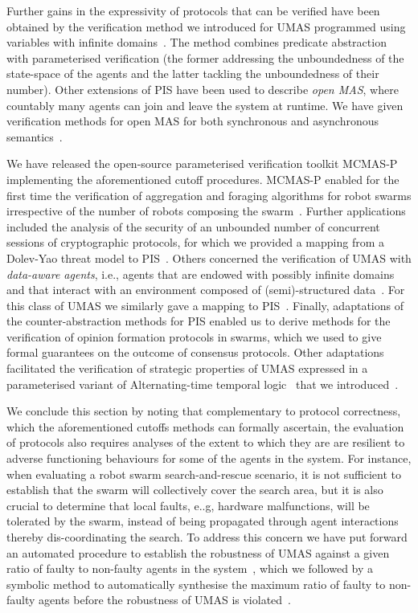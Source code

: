 \documentclass{article}
\begin{document}
Further gains in the expressivity of protocols that can be verified have been
obtained by the verification method we introduced for UMAS programmed using
variables with infinite domains~\cite{KouvarosLomuscio17a}. The method  combines
predicate abstraction~\cite{LomuscioMichaliszyn15} with parameterised
verification (the former addressing the unboundedness of the state-space of the
agents and the latter tackling the unboundedness of their number).  Other
extensions of PIS have been used to describe {\em open MAS}, where countably
many agents can join and leave the system at runtime. We have given verification
methods for open MAS for both synchronous and asynchronous
semantics~\cite{Kouvaros+19}.

We have released the open-source parameterised verification toolkit
\textsc{MCMAS-P} implementing the aforementioned cutoff procedures.
\textsc{MCMAS-P} enabled for the first time the verification of aggregation and
foraging algorithms for robot swarms irrespective of the number of robots
composing the swarm~\cite{KouvarosLomuscio15b,KouvarosLomuscio16a}.  Further
applications included the analysis of the security of an unbounded number of
concurrent sessions of cryptographic protocols, for which we provided a mapping
from a Dolev-Yao threat model to PIS~\cite{BoureanuKouvarosLomuscio16}.  Others
concerned  the verification of UMAS with {\em data-aware agents}, i.e., agents
that are endowed with possibly infinite domains and that interact with an
environment composed of (semi)-structured data~\cite{MontaliCalvaneseGiacomo14}.
For this class of UMAS we similarly  gave a mapping to
PIS~\cite{BelardinelliKouvarosLomuscio17}.  Finally,  adaptations of the
counter-abstraction methods for PIS  enabled us to derive methods for the
verification of opinion formation protocols in swarms, which we used to give
formal guarantees on the outcome of consensus protocols. Other adaptations
facilitated the verification of strategic properties of UMAS expressed in a
parameterised variant  of Alternating-time temporal logic~\cite{Alur+98a} that
we introduced~\cite{KouvarosLomuscio16c}.

We conclude this section by noting that complementary to protocol correctness,
which the aforementioned cutoffs methods can formally ascertain, the evaluation
of protocols also requires   analyses of the extent to which they are are
resilient to adverse functioning behaviours for some of the agents in the
system.  For instance, when evaluating a robot swarm search-and-rescue scenario,
it is not sufficient to establish that the swarm will collectively cover the
search area, but it is also crucial to determine that local faults, e..g,
hardware malfunctions, will be tolerated by the swarm, instead of being
propagated through agent interactions thereby dis-coordinating the search. To
address this concern we have put forward an automated procedure to establish the
robustness of UMAS against a given ratio of faulty to non-faulty agents in the
system~\cite{KouvarosLomuscio17b}, which we followed by a symbolic method to
automatically synthesise the maximum ratio of faulty to non-faulty agents
before the robustness of UMAS is violated~\cite{KouvarosLomuscioPirovano18}.  
\end{document}
